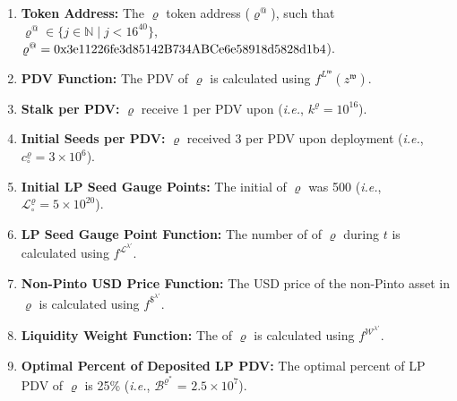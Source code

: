 \documentclass[class=article, crop=false]{standalone}
\begin{document}
\begin{enumerate}

    \item \textbf{Token Address:} The $\varrho$ token address ($\varrho^{@}$), such that $\varrho^{@} \in \{j \in \mathbb{N} \mid j < 16^{40} \}$, $\varrho^{@} = \\ \text{0x3e11226fe3d85142B734ABCe6e58918d5828d1b4}$).
    
    \item \textbf{PDV Function:} The PDV of $\varrho$ is calculated using $f^{L^{\mathfrak{w}}}(z^{\mathfrak{w}})$.
                
    \item \textbf{Stalk per PDV:} $\varrho$  receive 1  per PDV upon  (\textit{i.e.}, $k^{\varrho} = 10^{16}$).
    
    \item \textbf{Initial Seeds per PDV:} $\varrho$  received 3  per PDV upon deployment (\textit{i.e.}, ${c_{\circ}^{\varrho}} = 3 \times 10^6$).

    \item \textbf{Initial LP Seed Gauge Points:} The initial  of $\varrho$ was 500 (\textit{i.e.}, $\mathscr{L}_{\circ}^{\varrho} = 5 \times 10^{20}$).
    
    \item \textbf{LP Seed Gauge Point Function:} The number of  of $\varrho$ during $t$ is calculated using $f^{\mathscr{L}^{\lambda'}}$.

    \item \textbf{Non-Pinto USD Price Function:} The USD price of the non-Pinto asset in $\varrho$ is calculated using $f^{\$^{\lambda'}}$.

    \item \textbf{Liquidity Weight Function:} The  of $\varrho$ is calculated using $f^{\mathscr{W}^{\lambda'}}$.
    
    \item \textbf{Optimal Percent of Deposited LP PDV:} The optimal percent of  LP PDV of $\varrho$ is 25\% (\textit{i.e.}, $\mathscr{B}^{\varrho^{*}}$ = $2.5 \times 10^{7}$).


\end{enumerate}
\end{document}
